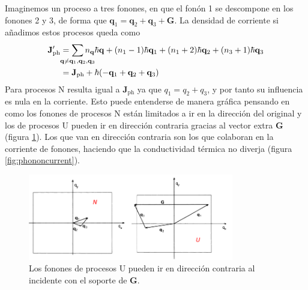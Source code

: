Imaginemos un proceso a tres fonones, en que el fonón 1 se descompone
en los fonones 2 y 3, de forma que
$\mathbf{q}_1 = \mathbf{q}_2 + \mathbf{q}_3 + \mathbf{G}$. La densidad
de corriente si añadimos estos procesos queda como
\begin{equation}
\begin{split}
  \mathbf{J}_\text{ph}' &= \sum_{\mathclap{\mathbf{q} \neq \mathbf{q}_1,
    \mathbf{q}_2, \mathbf{q}_3}} n_\mathbf{q} \hbar \mathbf{q} +
  (n_1 - 1)\hbar \mathbf{q}_1  + (n_1 + 2)\hbar \mathbf{q}_2 + (n_3 + 1)\hbar \mathbf{q}_3 \\
                       &=  \mathbf{J}_\text{ph} + \hbar(-\mathbf{q}_1 +
                         \mathbf{q}_2 + \mathbf{q}_3 )
\end{split}
\end{equation}
Para procesos N resulta igual a $\mathbf{J}_\text{ph}$ ya que $q_1 =
q_2 + q_3$, y por tanto su
influencia es nula en la corriente. Esto puede entenderse de manera
gráfica pensando en como los fonones de procesos N están limitados a
ir en la dirección del original y los de procesos U pueden ir en
dirección contraria gracias al vector extra $\mathbf{G}$ (figura \ref{fig:UNphonons}). Los que van
en dirección contraria son los que colaboran en la corriente de
fonones, haciendo que la conductividad térmica no diverja (figura \ref{fig:phononcurrent}).

\begin{figure}
  \centering
  \includegraphics[width=0.8\textwidth]{figures/UNphonons.png}
  \caption{Los fonones de procesos U pueden ir en dirección contraria
    al incidente con el soporte de $\mathbf{G}$.}
  \label{fig:UNphonons}
\end{figure}

